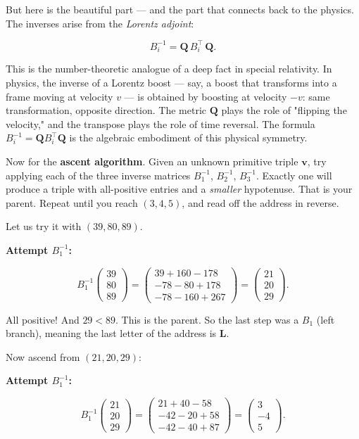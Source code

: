 \documentclass[11pt,openany]{book}
\theoremstyle{definition}
\theoremstyle{plain}
\theoremstyle{remark}
\begin{document}
But here is the beautiful part — and the part that connects back to the physics. The inverses arise from the \textit{Lorentz adjoint}:

$$B_i^{-1} = \mathbf{Q} \, B_i^\top \, \mathbf{Q}.$$

This is the number-theoretic analogue of a deep fact in special relativity. In physics, the inverse of a Lorentz boost — say, a boost that transforms into a frame moving at velocity $v$ — is obtained by boosting at velocity $-v$: same transformation, opposite direction. The metric $\mathbf{Q}$ plays the role of "flipping the velocity," and the transpose plays the role of time reversal. The formula $B_i^{-1} = \mathbf{Q} B_i^\top \mathbf{Q}$ is the algebraic embodiment of this physical symmetry.

Now for the \textbf{ascent algorithm}. Given an unknown primitive triple $\mathbf{v}$, try applying each of the three inverse matrices $B_1^{-1}$, $B_2^{-1}$, $B_3^{-1}$. Exactly one will produce a triple with all-positive entries and a \textit{smaller} hypotenuse. That is your parent. Repeat until you reach $(3, 4, 5)$, and read off the address in reverse.

Let us try it with $(39, 80, 89)$.

\textbf{Attempt $B_1^{-1}$:}

$$B_1^{-1} \begin{pmatrix} 39 \\ 80 \\ 89 \end{pmatrix} = \begin{pmatrix} 39 + 160 - 178 \\ -78 - 80 + 178 \\ -78 - 160 + 267 \end{pmatrix} = \begin{pmatrix} 21 \\ 20 \\ 29 \end{pmatrix}.$$

All positive! And $29 < 89$. This is the parent. So the last step was a $B_1$ (left branch), meaning the last letter of the address is \textbf{L}.

Now ascend from $(21, 20, 29)$:

\textbf{Attempt $B_1^{-1}$:}

$$B_1^{-1} \begin{pmatrix} 21 \\ 20 \\ 29 \end{pmatrix} = \begin{pmatrix} 21 + 40 - 58 \\ -42 - 20 + 58 \\ -42 - 40 + 87 \end{pmatrix} = \begin{pmatrix} 3 \\ -4 \\ 5 \end{pmatrix}.$$
\end{document}
